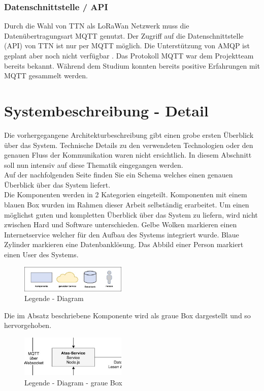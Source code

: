 \documentclass[11pt,english,german]{report}
\theoremstyle{definition}
\begin{document}
\subsection{Datenschnittstelle / API}
Durch die Wahl von TTN als LoRaWan Netzwerk muss die Datenübertragungsart MQTT genutzt. Der Zugriff auf die Datenschnittstelle (API) von TTN ist nur per MQTT möglich. Die Unterstützung von AMQP ist geplant aber noch nicht verfügbar  \cite{amqp}. Das Protokoll MQTT war dem Projektteam bereits bekannt. Während dem Studium konnten bereits positive Erfahrungen mit MQTT gesammelt werden.

\chapter{Systembeschreibung - Detail}
Die vorhergegangene Architekturbeschreibung gibt einen grobe ersten Überblick über das System. Technische Details zu  den verwendeten Technologien oder den genauen Fluss der Kommunikation waren nicht ersichtlich. In diesem Abschnitt soll nun intensiv auf diese Thematik eingegangen werden.\\[0.3cm]
Auf der nachfolgenden Seite finden Sie ein Schema welches einen genauen Überblick über das System liefert.\\[0.3cm]
Die Komponenten werden in 2 Kategorien eingeteilt. Komponenten mit einem blauen Box wurden im Rahmen dieser Arbeit selbständig erarbeitet. Um einen möglichst guten und kompletten Überblick über das System zu liefern, wird nicht zwischen Hard und Software unterschieden. Gelbe Wolken markieren einen Internetservice welcher für den Aufbau des Systems integriert wurde. Blaue Zylinder markieren eine Datenbanklösung. Das Abbild einer Person markiert einen User des Systems.

\begin{figure}[H]
	\centering
	\includegraphics[width=0.45\textwidth]{img/system/legend.jpg}
	\caption[Legende - Diagram]
	{Legende - Diagram}
\end{figure}

\noindent
Die im Absatz beschriebene Komponente wird als graue Box dargestellt und so hervorgehoben.
\begin{figure}[H]
	\centering
	\includegraphics[width=0.45\textwidth]{img/system/greybox.jpg}
	\caption[Legende - Diagram - graue Box]
	{Legende - Diagram - graue Box}
\end{figure}
\end{document}
